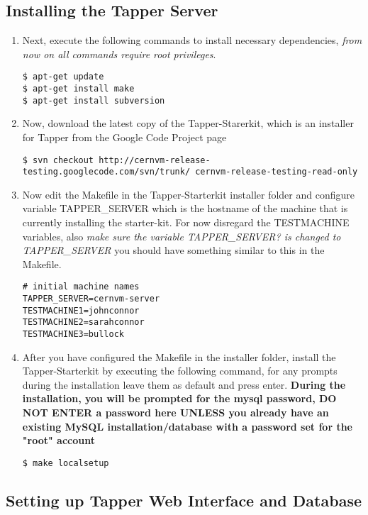 \subsection{Installing the Tapper Server}
\begin{enumerate}
\item Next, execute the following commands to install necessary dependencies, \emph{from now on all commands require root privileges}.
\lstset{caption= Install Dependencies}
\begin{lstlisting}
$ apt-get update
$ apt-get install make
$ apt-get install subversion
\end{lstlisting}

\item Now, download the latest copy of the Tapper-Starerkit, which is an installer for Tapper from the \cernvmreleasetesting 
Google Code Project page
\lstset{caption= Download Tapper-Starterkit}
\begin{lstlisting}
$ svn checkout http://cernvm-release-testing.googlecode.com/svn/trunk/ cernvm-release-testing-read-only
\end{lstlisting}

\item Now edit the Makefile in the Tapper-Starterkit installer folder and configure variable TAPPER\_SERVER which 
is the hostname of the machine that is currently installing the starter-kit. For now disregard the TESTMACHINE 
variables, also \emph{make sure the variable TAPPER\_SERVER? is changed to TAPPER\_SERVER} you should have something
similar to this in the Makefile.
\lstset{caption= Makefile Configuration}
\begin{lstlisting}
# initial machine names
TAPPER_SERVER=cernvm-server
TESTMACHINE1=johnconnor
TESTMACHINE2=sarahconnor
TESTMACHINE3=bullock
\end{lstlisting}

\item After you have configured the Makefile in the installer folder, install the Tapper-Starterkit by executing the
following command, for any prompts during the installation leave them as default and press enter. {\bf During
the installation, you will be prompted for the mysql password, DO NOT ENTER a password here UNLESS you already have an
existing MySQL installation/database with a password set for the "root" account}
\lstset{caption= Install Tapper-Starterkit}
\begin{lstlisting}
$ make localsetup
\end{lstlisting}
\end{enumerate}

\subsection{Setting up Tapper Web Interface and Database}